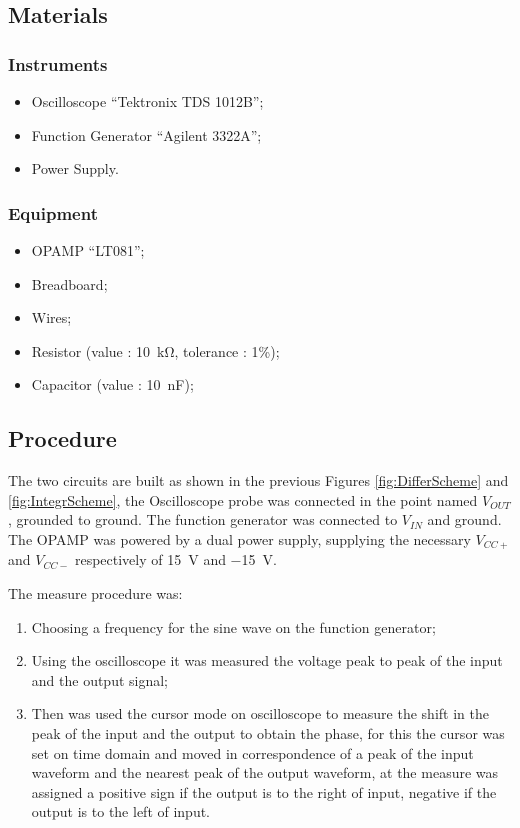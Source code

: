 \documentclass[a4paper, twocolumn]{article}
\begin{document}
\subsection{Materials}
\subsubsection{Instruments}
\begin{itemize}
    \item Oscilloscope ``Tektronix TDS 1012B'';
    \item Function Generator ``Agilent 3322A'';
    \item Power Supply.
\end{itemize}
\subsubsection{Equipment}
\begin{itemize}
    \item OPAMP ``LT081'';
    \item Breadboard;
    \item Wires;
    \item Resistor (value : \SI{10}{\kilo\ohm}, tolerance : 1\%);
    \item Capacitor (value : \SI{10}{\nano\farad});
\end{itemize}

\subsection{Procedure}

The two circuits are built as shown in the previous Figures \ref{fig:DifferScheme} and \ref{fig:IntegrScheme}, the Oscilloscope probe was connected in the point named \(V_{OUT}\), grounded to ground. The function generator was connected to \(V_{IN}\) and ground.   The OPAMP was powered by a dual power supply, supplying the necessary \(V_{CC+}\) and \(V_{CC-}\) respectively of \SI{15}{\volt} and \SI{-15}{\volt}.

The measure procedure was:
\begin{enumerate}
    \item Choosing a frequency for the sine wave on the function generator;
    \item Using the oscilloscope it was measured the voltage peak to peak of the input and the output signal;
    \item Then was used the cursor mode on oscilloscope to measure the shift in the peak of the input and the output to obtain the phase, for this the cursor was set on time domain and moved in correspondence of a peak of the input waveform and the nearest peak of the output waveform, at the measure was assigned a positive sign if the output is to the right of input, negative if the output is to the left of input. 
\end{enumerate}
\end{document}
